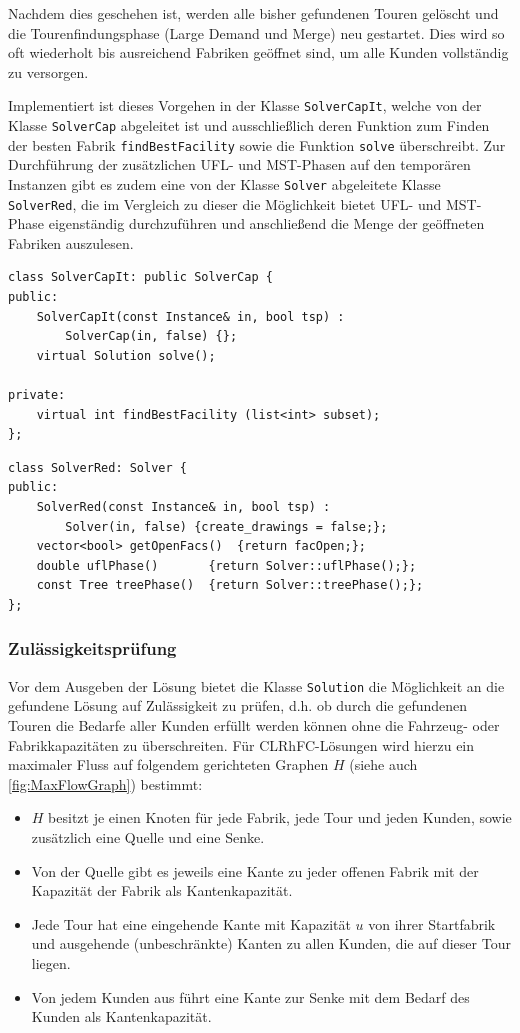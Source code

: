 \documentclass[a4paper,ngerman,11pt,bibtotoc]{scrartcl}
\theoremstyle{definition}
\theoremstyle{plain}
\theoremstyle{remark}
\newcommand{\CLRHFC}{CLRhFC}
\newcommand{\MST}{MST}
\newcommand{\UFL}{UFL}
\begin{document}
	Nachdem dies geschehen ist, werden alle bisher gefundenen Touren gelöscht und die Tourenfindungsphase (Large Demand und Merge) neu gestartet. Dies wird so oft wiederholt bis ausreichend Fabriken geöffnet sind, um alle Kunden vollständig zu versorgen.
	
	Implementiert ist dieses Vorgehen in der Klasse \lstinline|SolverCapIt|, welche von der Klasse \lstinline|SolverCap| abgeleitet ist und ausschließlich deren Funktion zum Finden der \glqq besten\grqq{} Fabrik \lstinline|findBestFacility| sowie die Funktion \lstinline|solve| überschreibt. Zur Durchführung der zusätzlichen \UFL- und \MST-Phasen auf den temporären Instanzen gibt es zudem eine von der Klasse \lstinline|Solver| abgeleitete Klasse \lstinline|SolverRed|, die im Vergleich zu dieser die Möglichkeit bietet \UFL- und \MST-Phase eigenständig durchzuführen und anschließend die Menge der geöffneten Fabriken auszulesen.

	\begin{lstlisting}[caption=Die Klasse SolverCapIt]
class SolverCapIt: public SolverCap {
public:
	SolverCapIt(const Instance& in, bool tsp) : 
		SolverCap(in, false) {};
	virtual Solution solve();

private:
	virtual int findBestFacility (list<int> subset);
};
	\end{lstlisting}	
	\begin{lstlisting}[caption=Die Klasse SolverRed]
class SolverRed: Solver {
public:
	SolverRed(const Instance& in, bool tsp) : 
		Solver(in, false) {create_drawings = false;};
	vector<bool> getOpenFacs() 	{return facOpen;};
	double uflPhase() 		{return Solver::uflPhase();};
	const Tree treePhase()	{return Solver::treePhase();};
};
	\end{lstlisting}
	
	\subsubsection{Zulässigkeitsprüfung}
	
	Vor dem Ausgeben der Lösung bietet die Klasse \lstinline|Solution| die Möglichkeit an die gefundene Lösung auf Zulässigkeit zu prüfen, d.h. ob durch die gefundenen Touren die Bedarfe aller Kunden erfüllt werden können ohne die Fahrzeug- oder Fabrikkapazitäten zu überschreiten. Für \CLRHFC-Lösungen wird hierzu ein maximaler Fluss auf folgendem gerichteten Graphen $H$ (siehe auch \cref{fig:MaxFlowGraph}) bestimmt:
	\begin{itemize}
		\item $H$ besitzt je einen Knoten für jede Fabrik, jede Tour und jeden Kunden, sowie zusätzlich eine Quelle und eine Senke.
		\item Von der Quelle gibt es jeweils eine Kante zu jeder offenen Fabrik mit der Kapazität der Fabrik als Kantenkapazität.
		\item Jede Tour hat eine eingehende Kante mit Kapazität $u$ von ihrer Startfabrik und ausgehende (unbeschränkte) Kanten zu allen Kunden, die auf dieser Tour liegen.
		\item Von jedem Kunden aus führt eine Kante zur Senke mit dem Bedarf des Kunden als Kantenkapazität.
	\end{itemize}
	
\end{document}
